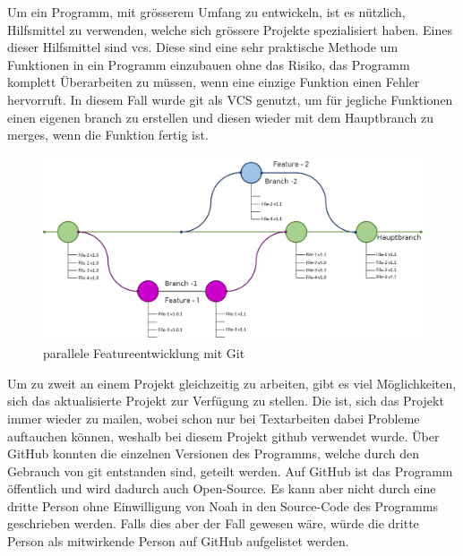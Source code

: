 \documentclass[a4paper,11pt]{article}
\begin{document}
Um ein Programm, mit grösserem Umfang zu entwickeln, ist es nützlich, Hilfsmittel zu verwenden, welche sich grössere Projekte spezialisiert haben. 
Eines dieser Hilfsmittel sind \gls{vcs}. Diese sind eine sehr praktische Methode um Funktionen in ein Programm einzubauen ohne das Risiko,
das Programm komplett Überarbeiten zu müssen, wenn eine einzige Funktion einen Fehler hervorruft. In diesem Fall wurde \Gls{git} als VCS genutzt, um für jegliche Funktionen
einen eigenen \Gls{branch} zu erstellen und diesen wieder mit dem Hauptbranch zu \glspl{merge}, wenn die Funktion fertig ist.\cite{git} \cite{github} \\

\begin{figure}[H]
    \centering
    \includegraphics[width=.8\textwidth]{media/gitflow2.png}
    \caption{parallele Featureentwicklung mit Git \cite{gitflowBlog}}
\end{figure}

Um zu zweit an einem Projekt gleichzeitig zu arbeiten, gibt es viel Möglichkeiten, sich das aktualisierte Projekt zur Verfügung zu stellen. Die  ist, sich das 
Projekt immer wieder zu mailen, wobei schon nur bei Textarbeiten dabei Probleme auftauchen können, weshalb bei diesem Projekt \Gls{github} 
verwendet wurde. Über GitHub konnten die einzelnen Versionen des Programms, welche durch den Gebrauch von \gls{git} entstanden sind, geteilt werden. 
Auf GitHub ist das Programm öffentlich und wird dadurch auch Open-Source. Es kann aber nicht durch eine dritte Person ohne Einwilligung von Noah in den Source-Code
des Programms geschrieben werden. Falls dies aber der Fall gewesen wäre, würde die dritte Person als mitwirkende Person auf GitHub aufgelistet werden. \cite{github} \\
\end{document}
